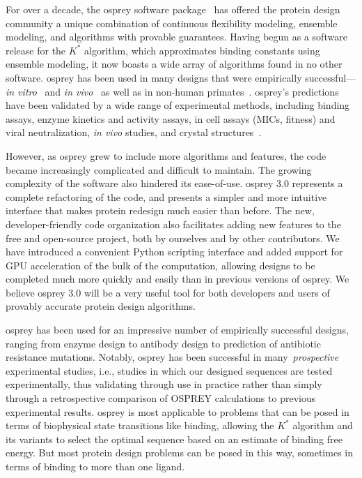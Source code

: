 For over a decade, the {\sc osprey} software package~\cite{OSPREY,minDEE,OSPREY_MIE} has offered the protein design community a unique combination of continuous flexibility modeling, ensemble modeling, and algorithms with provable guarantees.  Having begun as a software release for the $K^*$ algorithm, which approximates binding constants using ensemble modeling, it now boasts a wide array of algorithms found in no other software.  {\sc osprey} has been used in many designs that were empirically successful---\textit{in vitro}~\cite{VRC07_enhance,CFTR,runx1_cbfb,GrsA-LeuA,DHFR-PNAS,GrsA-TyrA,specific_probes} and \textit{in vivo}~\cite{VRC07_enhance,CFTR,runx1_cbfb,DHFR-PNAS} as well as in non-human primates~\cite{VRC07_enhance}.  {\sc osprey}'s predictions have been validated by a wide range of experimental methods, including binding assays, enzyme kinetics and activity assays, in cell assays (MICs, fitness) and viral neutralization, {\em in vivo} studies, and crystal structures~\cite{DHFR-PNAS2, VRC07_enhance}.    

However, as {\sc osprey} grew to include more algorithms and features, the code became increasingly complicated and difficult to maintain.  The growing complexity of the software also hindered its ease-of-use. {\sc osprey} 3.0 represents a complete refactoring of the code, and presents a simpler and more intuitive interface that makes protein redesign much easier than before. The new, developer-friendly code organization also facilitates adding new features to the free and open-source \osprey project, both by ourselves and by other contributors.  We have introduced a convenient Python scripting interface and added support for GPU acceleration of the bulk of the computation, allowing designs to be completed much more quickly and easily than in previous versions of {\sc osprey}.  We believe {\sc osprey} 3.0 will be a very useful tool for both developers and users of provably accurate protein design algorithms.  


{\sc osprey} has been used for an impressive number of empirically successful designs, ranging from enzyme design to antibody design to prediction of antibiotic resistance mutations.  Notably, {\sc osprey} has been successful in many~\textit{prospective} experimental studies, i.e., studies in which our designed sequences are tested experimentally, thus validating \osprey through use in practice rather than simply through a retrospective comparison of OSPREY calculations to previous experimental results.  {\sc osprey} is most applicable to problems that can be posed in terms of biophysical state transitions like binding, allowing the $K^*$ algorithm and its variants to select the optimal sequence based on an estimate of binding free energy.  But most protein design problems can be posed in this way, sometimes in terms of binding to more than one ligand.  

